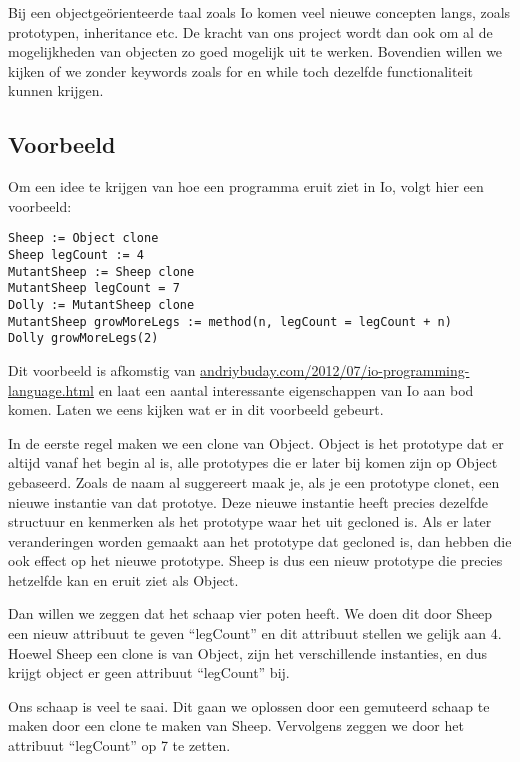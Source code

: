 \documentclass[12pt]{article}
\begin{document}
Bij een objectge\"orienteerde taal zoals Io komen veel nieuwe concepten langs, zoals prototypen, inheritance etc. De kracht van ons project wordt dan ook om al de mogelijkheden van objecten zo goed mogelijk uit te werken.  Bovendien willen we kijken of we zonder keywords zoals for en while toch dezelfde functionaliteit kunnen krijgen.


\subsection*{Voorbeeld}
Om een idee te krijgen van hoe een programma eruit ziet in Io, volgt hier een voorbeeld:
\begin{lstlisting}[frame=single]
Sheep := Object clone
Sheep legCount := 4
MutantSheep := Sheep clone
MutantSheep legCount = 7
Dolly := MutantSheep clone
MutantSheep growMoreLegs := method(n, legCount = legCount + n)
Dolly growMoreLegs(2)
\end{lstlisting}
Dit voorbeeld is afkomstig van \url{andriybuday.com/2012/07/io-programming-language.html} en laat een aantal interessante eigenschappen van Io aan bod komen. Laten we eens kijken wat er in dit voorbeeld gebeurt.\newline

In de eerste regel maken we een clone van Object. Object is het prototype dat er altijd vanaf het begin al is,
alle prototypes die er later bij komen zijn op Object gebaseerd.
Zoals de naam al suggereert maak je, als je een prototype clonet, een nieuwe instantie van dat prototye.
Deze nieuwe instantie heeft precies dezelfde structuur en kenmerken als het prototype waar het uit gecloned is.
Als er later veranderingen worden gemaakt aan het prototype dat gecloned is, dan hebben die ook effect op het nieuwe prototype.
Sheep is dus een nieuw prototype die precies hetzelfde kan en eruit ziet als Object.\newline

Dan willen we zeggen dat het schaap vier poten heeft.
We doen dit door Sheep een nieuw attribuut te geven ``legCount'' en dit attribuut stellen we gelijk aan 4.
Hoewel Sheep een clone is van Object, zijn het verschillende instanties, en dus krijgt object er geen attribuut ``legCount'' bij.\newline

Ons schaap is veel te saai. Dit gaan we oplossen door een gemuteerd schaap te maken door een clone te maken van Sheep. Vervolgens zeggen we door het attribuut ``legCount'' op 7 te zetten.\newline
\end{document}
